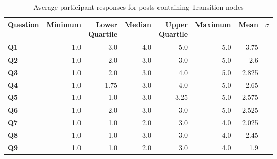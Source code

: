 \begin{table}
\centering
\caption{Average participant responses for posts containing Transition nodes}
\label{table:perception:transition-average}
\begin{tabular}{ l | r | r | r | r | r | r | r}
\textbf{Question} & \textbf{Minimum} & \pbox{2cm}{\textbf{Lower}\\ \textbf{Quartile}} & \textbf{Median} & \pbox{2cm}{\textbf{Upper}\\ \textbf{Quartile}} & \textbf{Maximum} & \textbf{Mean} & \textbf{$\sigma$}\\
\hline
\textbf{Q1} &  1.0 & 3.0 & 4.0 & 5.0 & 5.0 & 3.75 &  \\
\hline
\textbf{Q2} &  1.0 & 2.0 & 3.0 & 3.0 & 5.0 & 2.6 &  \\
\hline
\textbf{Q3} &  1.0 & 2.0 & 3.0 & 4.0 & 5.0 & 2.825 &  \\
\hline
\textbf{Q4} &  1.0 & 1.75 & 3.0 & 4.0 & 5.0 & 2.65 &  \\
\hline
\textbf{Q5} &  1.0 & 1.0 & 3.0 & 3.25 & 5.0 & 2.575 &  \\
\hline
\textbf{Q6} &  1.0 & 2.0 & 3.0 & 3.0 & 5.0 & 2.525 &  \\
\hline
\textbf{Q7} &  1.0 & 1.0 & 2.0 & 3.0 & 4.0 & 2.025 &  \\
\hline
\textbf{Q8} &  1.0 & 1.0 & 3.0 & 3.0 & 4.0 & 2.45 &  \\
\hline
\textbf{Q9} &  1.0 & 1.0 & 2.0 & 3.0 & 4.0 & 1.9 &  \\
\end{tabular}
\end{table}




